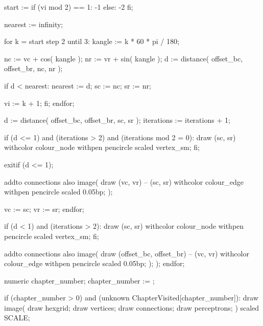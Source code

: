         start := if (vi mod 2) == 1: -1 else: -2 fi;

        nearest := infinity;

        for k = start step 2 until 3:
          kangle := k * 60 * pi / 180;

          nc := vc + cos( kangle );
          nr := vr + sin( kangle );
          d := distance( offset_bc, offset_br, nc, nr );

          if d < nearest:
            nearest := d;
            sc := nc;
            sr := nr;

            vi := k + 1;
          fi;
        endfor;

        d := distance( offset_bc, offset_br, sc, sr );
        iterations := iterations + 1;

        if (d <= 1) and (iterations > 2) and (iterations mod 2 = 0):
          draw (sc, sr)
            withcolor colour_node
            withpen pencircle
            scaled vertex_sm;
        fi;

        exitif (d <= 1);

        addto connections also image(
          draw (vc, vr) -- (sc, sr)
            withcolor colour_edge
            withpen pencircle
            scaled 0.05bp;
        );

        vc := sc;
        vr := sr;
      endfor;

      if (d < 1) and (iterations > 2):
        draw (sc, sr)
          withcolor colour_node
          withpen pencircle
          scaled vertex_sm;
      fi;

      addto connections also image(
        draw (offset_bc, offset_br) -- (vc, vr)
          withcolor colour_edge
          withpen pencircle
          scaled 0.05bp;
      );
    );
  endfor;

  numeric chapter_number;
  chapter_number := ;

  if (chapter_number > 0) and (unknown ChapterVisited[chapter_number]):
    draw image(
      draw hexgrid;
      draw vertices;
      draw connections;
      draw perceptrons;
    ) scaled SCALE;


